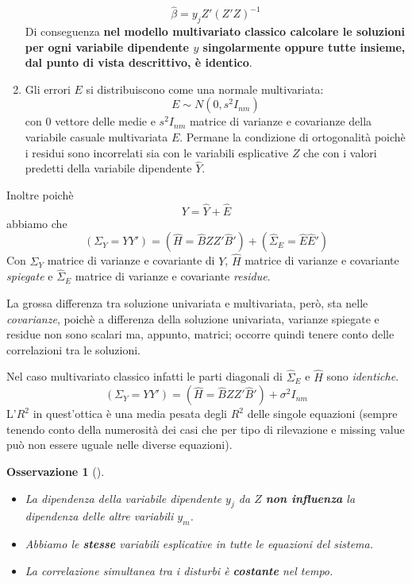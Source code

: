 \documentclass[a4page, 11pt]{article} %
\newtheorem*{remark}{Osservazione}
\begin{document}
\begin{enumerate}[noitemsep]
\begin{equation*}
\hat{\beta} = y_j Z'(Z'Z)^{-1}
\end{equation*}
Di conseguenza \textbf{nel modello multivariato classico calcolare le soluzioni per ogni variabile dipendente $y$ singolarmente oppure tutte insieme, dal punto di vista descrittivo, è identico}.
\item Gli errori $E$ si distribuiscono come una normale multivariata:
\begin{equation*}
E \sim N(0,s^2 I_{nm})
\end{equation*}
con $0$ vettore delle medie  e $s^2 I_{nm}$ matrice di varianze e covarianze della variabile casuale multivariata $E$. Permane la condizione di ortogonalità poichè i residui sono incorrelati sia con le variabili esplicative $Z$ che con i valori predetti della variabile dipendente $\hat{Y}$.
\end{enumerate}
Inoltre poichè
\begin{equation*}
Y = \hat{Y} + \hat{E}
\end{equation*}
abbiamo che
\begin{equation*}
(\Sigma_Y = YY') = (\hat{H}=\hat{B}ZZ'\hat{B}')+(\hat{\Sigma}_E=\hat{E}\hat{E}')
\end{equation*}
Con $\Sigma_Y$ matrice di varianze e covariante di $Y$, $\hat{H}$ matrice di varianze e covariante \textit{spiegate} e $\hat{\Sigma}_E$ matrice di varianze e covariante \textit{residue}.

La grossa differenza tra soluzione univariata e multivariata, però, sta nelle \textit{covarianze}, poichè a differenza della soluzione univariata, varianze spiegate e residue non sono scalari ma, appunto, matrici; occorre quindi tenere conto delle correlazioni tra le soluzioni.

Nel caso multivariato classico infatti le parti diagonali di $\hat{\Sigma}_E$ e $\hat{H}$ sono \textit{identiche}.
\begin{equation*}
(\Sigma_Y = YY') = (\hat{H}=\hat{B}ZZ'\hat{B}')+\sigma^2 I_{nm}
\end{equation*}
L’$R^{2}$ in quest'ottica è una media pesata degli $R^{2}$ delle singole equazioni (sempre tenendo conto della numerosità dei casi che per tipo di rilevazione e missing value può non essere uguale nelle diverse equazioni).

\begin{remark}[]\ \\
\begin{itemize}
\item La dipendenza della variabile dipendente $y_j$ da $Z$ \textbf{non influenza} la dipendenza delle altre variabili $y_m$.
\item Abbiamo le \textbf{stesse} variabili esplicative in tutte le equazioni del sistema.
\item La correlazione simultanea tra i disturbi è \textbf{costante} nel tempo.
\end{itemize}
\end{remark}
\end{document}
